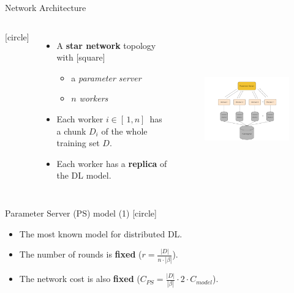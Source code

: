 \begin{frame}{Network Architecture}
    \begin{columns}
        [circle]
        \begin{itemize}
            \item{A \textbf{star network} topology with
            [square]
            \begin{itemize}
                \item a \emph{parameter server}
                \item $n$ \emph{workers}
            \end{itemize}}
            \vspace{0.2cm}
            \item{Each worker $i \in [\,1,n]\,$ has a chunk $D_i$ of the whole training set $D$.}
            \vspace{0.2cm}
            \item{Each worker has a \textbf{replica} of the DL model.}
        \end{itemize}
        \begin{figure}
            \includegraphics[width=8.5cm,height=6cm,center]{images/parameter-server.png}\label{fig:param-server}
        \end{figure}
    \end{columns}
\end{frame}

\begin{frame}{Parameter Server (PS) model (1)}
    [circle]
    \begin{itemize}
        \item{The most known model for distributed DL.}
        \vspace{1cm}
        \item{The number of rounds is \textbf{fixed} ($r = \frac{|D|}{n \cdot |\beta|}$).}
        \vspace{1cm}
        \item{The network cost is also \textbf{fixed} ($C_{PS} = \frac{|D|}{|\beta|} \cdot 2 \cdot C_{model}$).}
    \end{itemize}
\end{frame}

